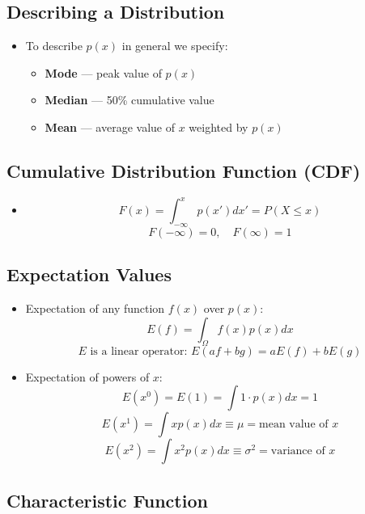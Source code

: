 \subsection{Describing a Distribution}

\begin{itemize}
    \item To describe $p(x)$ in general we specify:
          \begin{itemize}
              \item \textbf{Mode} — peak value of $p(x)$
              \item \textbf{Median} — 50\% cumulative value
              \item \textbf{Mean} — average value of $x$ weighted by $p(x)$
          \end{itemize}
\end{itemize}

\subsection{Cumulative Distribution Function (CDF)}

\begin{itemize}
    \item
          \[ F(x) = \int_{-\infty}^{x} p(x') dx' = P(X \leq x) \]
          \[ F(-\infty) = 0, \quad F(\infty) = 1 \]
\end{itemize}

\subsection{Expectation Values}

\begin{itemize}
    \item Expectation of any function $f(x)$ over $p(x)$:
          \[ E(f) = \int_{\Omega} f(x) p(x) dx \]
          \[ E \text{ is a linear operator: } E(af + bg) = aE(f) + bE(g) \]

    \item Expectation of powers of $x$:
          \[ E(x^0) = E(1) = \int 1 \cdot p(x) dx = 1 \]
          \[ E(x^1) = \int x p(x) dx \equiv \mu = \text{mean value of } x \]
          \[ E(x^2) = \int x^2 p(x) dx \equiv \sigma^2 = \text{variance of } x \]
\end{itemize}

\subsection{Characteristic Function}

